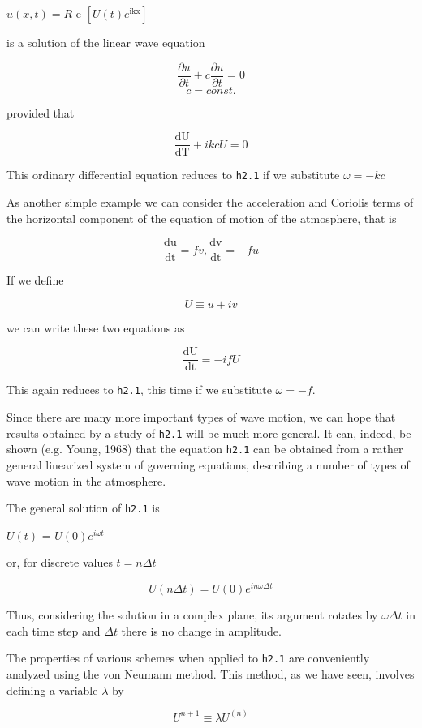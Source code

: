 \(u\left( x,t \right) = R\) e
\(\left\lbrack U\left( t \right)e^{\text{ikx}} \right\rbrack\)

is a solution of the linear wave equation

\[\frac{\partial u}{\partial t} + c\frac{\partial u}{\partial t} = 0\]\[c = const.\]

provided that

\[\frac{\text{dU}}{\text{dT}} + ikcU = 0\]

This ordinary differential equation reduces to \texttt{h2.1} if we
substitute \(\omega = - kc\)

As another simple example we can consider the acceleration and Coriolis
terms of the horizontal component of the equation of motion of the
atmosphere, that is

\[\frac{\text{du}}{\text{dt}} = fv,\frac{\text{dv}}{\text{dt}} = - fu\]

If we define

\[U \equiv u + iv\]

we can write these two equations as

\[\frac{\text{dU}}{\text{dt}} = - ifU\]

This again reduces to \texttt{h2.1}, this time if we substitute
\(\omega = - f\).

Since there are many more important types of wave motion, we can hope
that results obtained by a study of \texttt{h2.1} will be much more
general. It can, indeed, be shown (e.g. Young, 1968) that the equation
\texttt{h2.1} can be obtained from a rather general linearized system of
governing equations, describing a number of types of wave motion in the
atmosphere.

The general solution of \texttt{h2.1} is

\(U\left( t \right)\) = \(U\left( 0 \right)e^{i \omega t}\)

or, for discrete values \(t = n\Delta t\)

\[U( n \Delta t ) = U( 0 )e^{i n \omega \Delta t}\]

Thus, considering the solution in a complex plane, its argument rotates
by \(\omega\Delta t\) in each time step and \(\Delta t\) there is no
change in amplitude.

The properties of various schemes when applied to \texttt{h2.1} are
conveniently analyzed using the von Neumann method. This method, as we
have seen, involves defining a variable \(\lambda\) by

\[U^{n + 1} \equiv \lambda U^{\left( n \right)}\]

